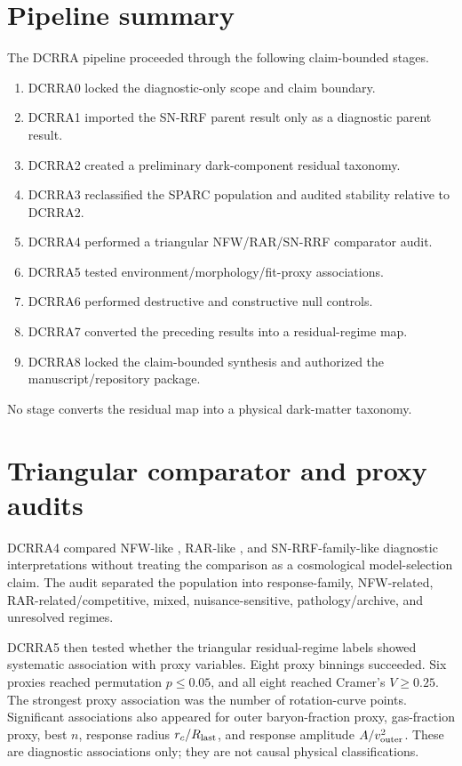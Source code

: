 \documentclass[11pt,a4paper]{article}
\begin{document}
\section{Pipeline summary}
The DCRRA pipeline proceeded through the following claim-bounded stages.
\begin{enumerate}
\item DCRRA0 locked the diagnostic-only scope and claim boundary.
\item DCRRA1 imported the SN-RRF parent result only as a diagnostic parent result.
\item DCRRA2 created a preliminary dark-component residual taxonomy.
\item DCRRA3 reclassified the SPARC population and audited stability relative to DCRRA2.
\item DCRRA4 performed a triangular NFW/RAR/SN-RRF comparator audit.
\item DCRRA5 tested environment/morphology/fit-proxy associations.
\item DCRRA6 performed destructive and constructive null controls.
\item DCRRA7 converted the preceding results into a residual-regime map.
\item DCRRA8 locked the claim-bounded synthesis and authorized the manuscript/repository package.
\end{enumerate}
No stage converts the residual map into a physical dark-matter taxonomy.

\section{Triangular comparator and proxy audits}
DCRRA4 compared NFW-like \cite{nfw1997}, RAR-like \cite{mcgaugh2016}, and SN-RRF-family-like \cite{yoshimura2026snrrf} diagnostic interpretations without treating the comparison as a cosmological model-selection claim. The audit separated the population into response-family, NFW-related, RAR-related/competitive, mixed, nuisance-sensitive, pathology/archive, and unresolved regimes.

DCRRA5 then tested whether the triangular residual-regime labels showed systematic association with proxy variables. Eight proxy binnings succeeded. Six proxies reached permutation $p\leq 0.05$, and all eight reached Cramer's $V \geq 0.25$. The strongest proxy association was the number of rotation-curve points. Significant associations also appeared for outer baryon-fraction proxy, gas-fraction proxy, best $n$, response radius $r_c/R_{\rm last}$, and response amplitude $A/v_{\rm outer}^2$. These are diagnostic associations only; they are not causal physical classifications.
\end{document}

